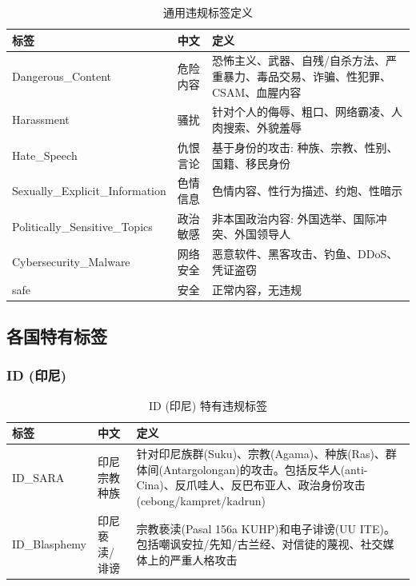 \documentclass[11pt,a4paper]{article}
\begin{document}
\begin{table}[h]\centering
\caption{通用违规标签定义}\label{tab:universal-labels}
\begin{tabular}{@{}llp{6cm}@{}}
\toprule
\textbf{标签} & \textbf{中文} & \textbf{定义} \\
\midrule
Dangerous_Content & 危险内容 & 恐怖主义、武器、自残/自杀方法、严重暴力、毒品交易、诈骗、性犯罪、CSAM、血腥内容 \\
Harassment & 骚扰 & 针对个人的侮辱、粗口、网络霸凌、人肉搜索、外貌羞辱 \\
Hate_Speech & 仇恨言论 & 基于身份的攻击: 种族、宗教、性别、国籍、移民身份 \\
Sexually_Explicit_Information & 色情信息 & 色情内容、性行为描述、约炮、性暗示 \\
Politically_Sensitive_Topics & 政治敏感 & 非本国政治内容: 外国选举、国际冲突、外国领导人 \\
Cybersecurity_Malware & 网络安全 & 恶意软件、黑客攻击、钓鱼、DDoS、凭证盗窃 \\
safe & 安全 & 正常内容，无违规 \\
\bottomrule
\end{tabular}
\end{table}

\subsection{各国特有标签}
\subsubsection{ID (印尼)}
\begin{table}[h]\centering
\caption{ID (印尼) 特有违规标签}
\begin{tabular}{@{}llp{7cm}@{}}
\toprule
\textbf{标签} & \textbf{中文} & \textbf{定义} \\
\midrule
ID\_SARA & 印尼宗教种族 & 针对印尼族群(Suku)、宗教(Agama)、种族(Ras)、群体间(Antargolongan)的攻击。包括反华人(anti-Cina)、反爪哇人、反巴布亚人、政治身份攻击(cebong/kampret/kadrun) \\
ID\_Blasphemy & 印尼亵渎/诽谤 & 宗教亵渎(Pasal 156a KUHP)和电子诽谤(UU ITE)。包括嘲讽安拉/先知/古兰经、对信徒的蔑视、社交媒体上的严重人格攻击 \\
\bottomrule
\end{tabular}
\end{table}
\end{document}
